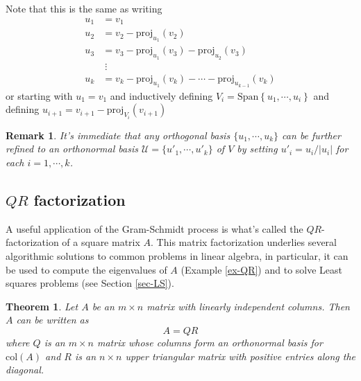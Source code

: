 \documentclass[12pt]{article}
\numberwithin{equation}{subsection}
\numberwithin{figure}{subsection}
\newtheorem{thm}[subsection]{Theorem}
\theoremstyle{note}
\newtheorem{remark}[subsection]{Remark}
\newcommand\Span[1]{\mathrm{Span}\left\{#1\right\}}
\newcommand\col[1]{\mathrm{col}(#1)}
\newcommand\proj[2]{\mathrm{proj}_{#1}(#2)}
\begin{document}
Note that this is the same as writing
\begin{align}
	u_1 &= v_1 \nonumber \\
	u_2 &= v_2- \proj{u_1}{v_2} \nonumber\\
	u_3 &= v_3 -\proj{u_1}{v_3}-\proj{u_2}{v_3} \nonumber \\
	& \;\vdots \nonumber\\
	u_k &= v_k - \proj{u_1}{v_k} - \cdots -\proj{u_{k-1}}{v_{k}}
\end{align}
or starting with $u_1=v_1$ and inductively defining $V_i=\Span{u_1,\cdots,u_i}$ and defining $u_{i+1}=v_{i+1}-\proj{V_i}{v_{i+1}}$

 \begin{remark} It's immediate that any orthogonal basis $\{u_1,\cdots,u_k\}$ can be further refined to an ortho\textit{normal} basis $\mathcal{U}=\{u'_1,\cdots,u'_k\}$ of $V$ by setting $u'_i=u_i/|u_i|$ for each $i=1,\cdots,k$. 
 \end{remark}

\subsection{$QR$ factorization}

A useful application of the Gram-Schmidt process is what's called the $QR$-factorization of a square matrix $A$. This matrix factorization underlies several algorithmic solutions to common problems in linear algebra, in particular, it can be used to compute the eigenvalues of $A$ (Example \ref{ex-QR}) and to solve Least squares problems (see Section \ref{sec-LS}).
\begin{thm} \label{thm-QR}Let $A$ be an $m\times n$ matrix with linearly independent columns. Then $A$ can be written as \begin{equation} A=QR\end{equation} where $Q$ is an $m\times n$ matrix whose columns form an orthonormal basis for $\col{A}$ and $R$ is an $n\times n$ upper triangular matrix with positive entries along the diagonal.\end{thm}
\end{document}
